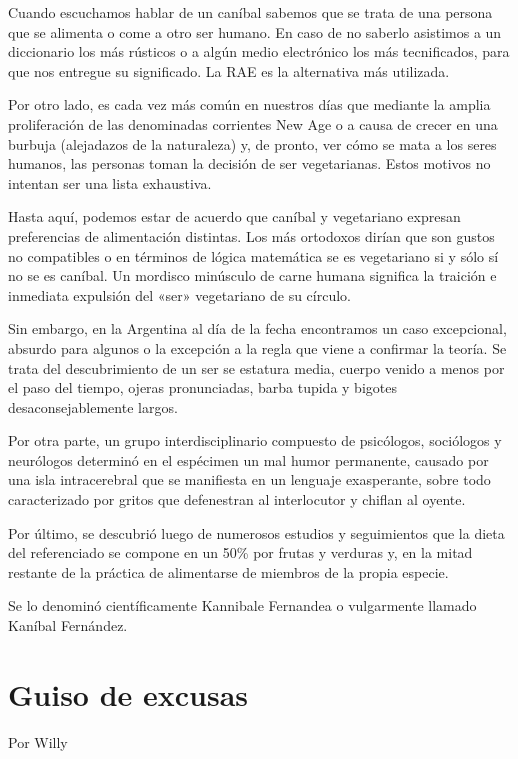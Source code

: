 \documentclass[11pt,twoside,openright,a5paper]{book}
\begin{document}
Cuando escuchamos hablar de un caníbal sabemos que se trata de una persona que se alimenta o come a otro ser humano. En caso de no saberlo asistimos a un diccionario los más rústicos o a algún medio electrónico los más tecnificados, para que nos entregue su significado. La RAE es la alternativa más utilizada.

Por otro lado, es cada vez más común en nuestros días que mediante la amplia proliferación de las denominadas corrientes New Age o a causa de crecer  en una burbuja (alejadazos de la naturaleza) y, de pronto, ver cómo se mata a los seres humanos, las personas toman la decisión de ser vegetarianas. Estos motivos no intentan ser una lista exhaustiva.

Hasta aquí, podemos estar de acuerdo que caníbal y vegetariano expresan preferencias de alimentación distintas. Los más ortodoxos dirían que son gustos no compatibles o en términos de lógica matemática se es vegetariano si y sólo sí no se es caníbal. Un mordisco minúsculo de carne humana significa la traición e inmediata expulsión del «ser» vegetariano de su círculo.

Sin embargo, en la Argentina al día de la fecha encontramos un caso excepcional, absurdo para algunos o la excepción a la regla que viene a confirmar la teoría. Se trata del descubrimiento de un ser se estatura media, cuerpo venido a menos por el paso del tiempo, ojeras pronunciadas, barba tupida y bigotes desaconsejablemente largos.

Por otra parte, un grupo interdisciplinario compuesto de psicólogos, sociólogos y neurólogos determinó en el espécimen un mal humor permanente, causado por una isla intracerebral que se manifiesta en un lenguaje exasperante, sobre todo caracterizado por gritos que defenestran al interlocutor y chiflan al oyente. 

Por último, se descubrió luego de numerosos estudios y seguimientos que la dieta del referenciado se compone en un 50\% por frutas y verduras y, en la mitad restante de la práctica de alimentarse de miembros de la propia especie.

Se lo denominó científicamente Kannibale Fernandea o vulgarmente llamado Kaníbal Fernández.

\section*{Guiso de excusas}

                                                                                                    \begin{flushright}Por Willy\end{flushright}
\end{document}

